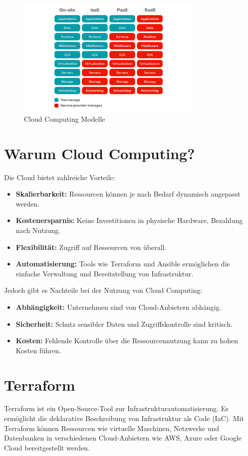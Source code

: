 \begin{figure}[H]
    \centering
    \includegraphics[width=0.8\textwidth]{resources/images/cloudcomputingtiers.png}
    \caption{Cloud Computing Modelle}
\end{figure}

\section{Warum Cloud Computing?}
Die Cloud bietet zahlreiche Vorteile:
\begin{itemize}
    \item \textbf{Skalierbarkeit:} Ressourcen können je nach Bedarf dynamisch angepasst werden.
    \item \textbf{Kostenersparnis:} Keine Investitionen in physische Hardware, Bezahlung nach Nutzung.
    \item \textbf{Flexibilität:} Zugriff auf Ressourcen von überall.
    \item \textbf{Automatisierung:} Tools wie Terraform und Ansible ermöglichen die einfache Verwaltung und Bereitstellung von Infrastruktur.
\end{itemize}

Jedoch gibt es Nachteile bei der Nutzung von Cloud Computing:
\begin{itemize}
    \item \textbf{Abhängigkeit:} Unternehmen sind von Cloud-Anbietern abhängig.
    \item \textbf{Sicherheit:} Schutz sensibler Daten und Zugriffskontrolle sind kritisch.
    \item \textbf{Kosten:} Fehlende Kontrolle über die Ressourcennutzung kann zu hohen Kosten führen.
\end{itemize}

\section{Terraform}
Terraform ist ein Open-Source-Tool zur Infrastrukturautomatisierung. Es ermöglicht die deklarative Beschreibung von Infrastruktur als Code (IaC). Mit Terraform können Ressourcen wie virtuelle Maschinen, Netzwerke und Datenbanken in verschiedenen Cloud-Anbietern wie AWS, Azure oder Google Cloud bereitgestellt werden. 

